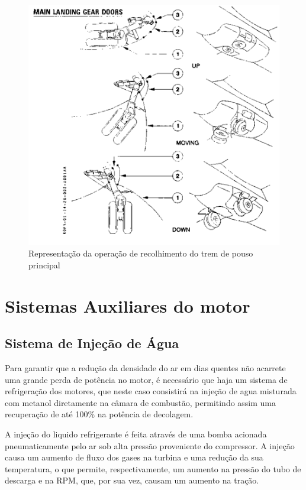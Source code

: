 \begin{figure}
\centering
\includegraphics[width=\textwidth]{images/parte3/sistemas_trem_de_pouso.png}
\caption{Representação da operação de recolhimento do trem de pouso principal}
\label{fig:sistemas_trem_de_pouso}
\end{figure}


\section{Sistemas Auxiliares do motor}

\subsection{Sistema de Injeção de Água}

Para garantir que a redução da densidade do ar em dias quentes não acarrete uma grande perda de potência no motor, é necessário que haja um sistema de refrigeração dos motores, que neste caso consistirá na injeção de agua misturada com metanol diretamente na câmara de combustão, permitindo assim uma recuperação de até 100\% na potência de decolagem.

A injeção do liquido refrigerante é feita através de uma bomba acionada pneumaticamente pelo ar sob alta pressão proveniente do compressor.
A injeção causa um aumento de fluxo dos gases na turbina e uma redução da sua temperatura, o que permite, respectivamente, um aumento na pressão do tubo de descarga e na RPM, que, por sua vez, causam um aumento na tração.

